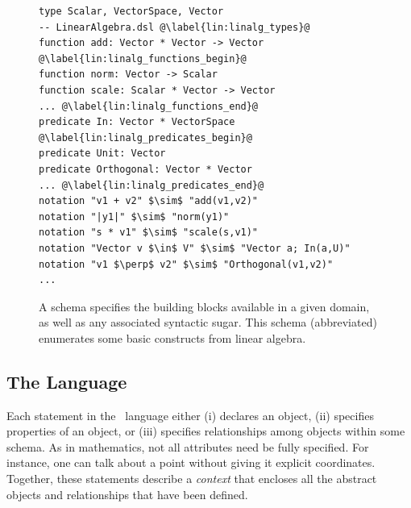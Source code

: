 \begin{figure}
\begin{mdframed}[style=DSLCode]
\begin{lstlisting}[language=Elem,escapechar=@]
type Scalar, VectorSpace, Vector                            -- LinearAlgebra.dsl @\label{lin:linalg_types}@
function add: Vector * Vector -> Vector @\label{lin:linalg_functions_begin}@
function norm: Vector -> Scalar
function scale: Scalar * Vector -> Vector
... @\label{lin:linalg_functions_end}@
predicate In: Vector * VectorSpace @\label{lin:linalg_predicates_begin}@
predicate Unit: Vector
predicate Orthogonal: Vector * Vector
... @\label{lin:linalg_predicates_end}@
notation "v1 + v2" $\sim$ "add(v1,v2)"
notation "|y1|" $\sim$ "norm(y1)"
notation "s * v1" $\sim$ "scale(s,v1)"
notation "Vector v $\in$ V" $\sim$ "Vector a; In(a,U)"
notation "v1 $\perp$ v2" $\sim$ "Orthogonal(v1,v2)"
...
\end{lstlisting}
\end{mdframed}
   \caption{A \Domain{} schema specifies the building blocks available in a given domain, as well as any associated syntactic sugar.  This schema (abbreviated) enumerates some basic constructs from linear algebra.\label{fig:domain_linalg}}
\end{figure}


\subsection{The \Substance{} Language}
\label{sec:TheSubstanceLanguage}

Each statement in the \Substance\ language either (i) declares an object, (ii) specifies properties of an object, or (iii) specifies relationships among objects within some \Domain{} schema.  As in mathematics, not all attributes need be fully specified. For instance, one can talk about a point without giving it explicit coordinates. Together, these statements describe a \emph{context} that encloses all the abstract objects and relationships that have been defined.

